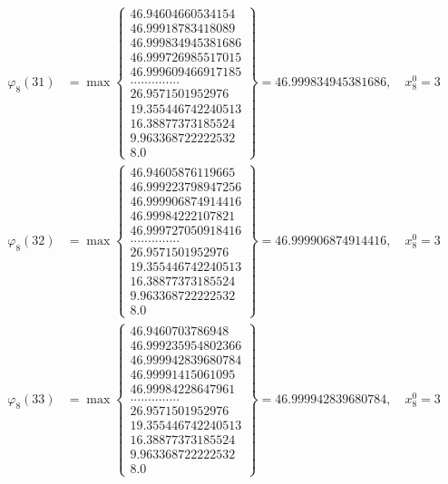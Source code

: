 \documentclass{article}
\begin{document}
\begin{align*}
  
  
  
\varphi_{8}(31) &= \max \left\{ \begin{array}{c}
46.94604660534154 \\
 46.99918783418089 \\
 46.999834945381686 \\
 46.999726985517015 \\
 46.999609466917185 \\
 .............. \\
 26.9571501952976 \\
 19.355446742240513 \\
 16.38877373185524 \\
 9.963368722222532 \\
 8.0
\end{array} \right\} = 46.999834945381686, \quad x_{8}^0 = 3\\
  
  
  
  
\varphi_{8}(32) &= \max \left\{ \begin{array}{c}
46.94605876119665 \\
 46.999223798947256 \\
 46.999906874914416 \\
 46.99984222107821 \\
 46.999727050918416 \\
 .............. \\
 26.9571501952976 \\
 19.355446742240513 \\
 16.38877373185524 \\
 9.963368722222532 \\
 8.0
\end{array} \right\} = 46.999906874914416, \quad x_{8}^0 = 3\\
  
  
  
  
\varphi_{8}(33) &= \max \left\{ \begin{array}{c}
46.9460703786948 \\
 46.999235954802366 \\
 46.999942839680784 \\
 46.99991415061095 \\
 46.99984228647961 \\
 .............. \\
 26.9571501952976 \\
 19.355446742240513 \\
 16.38877373185524 \\
 9.963368722222532 \\
 8.0
\end{array} \right\} = 46.999942839680784, \quad x_{8}^0 = 3\\
  

\end{align*}
\end{document}
